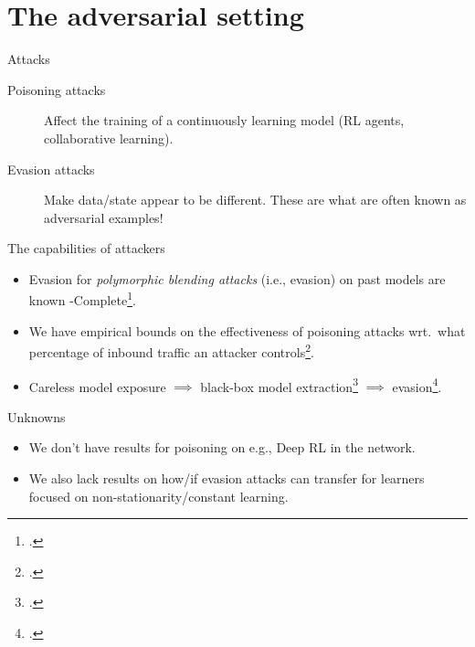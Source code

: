\documentclass[aspectratio=169,xcolor={dvipsnames}
,hide notes
]{beamer}
\begin{document}
\section{The adversarial setting}

\begin{frame}{Attacks}
	\begin{description}
		\item[Poisoning attacks] Affect the training of a continuously learning model (RL agents, collaborative learning).
		
		\item[Evasion attacks] Make data/state appear to be different. These are what are often known as \alert{adversarial examples}!
	\end{description}
\end{frame}

\begin{frame}{The capabilities of attackers}
	\begin{itemize}
		\item Evasion for \emph{polymorphic blending attacks} (i.e., evasion) on past models are known \NP-Complete\footcite{DBLP:conf/ccs/FoglaL06}.
	
		\item We have empirical bounds on the effectiveness of poisoning attacks wrt.\ what percentage of inbound traffic an attacker controls\footcite{DBLP:journals/jmlr/KloftL10}.
		
		\item Careless model exposure $\implies$ black-box model extraction\footcite{DBLP:conf/uss/TramerZJRR16} $\implies$ evasion\footcite{DBLP:conf/sp/Carlini017}.
		
	\end{itemize}
\end{frame}

\begin{frame}{Unknowns}
	\begin{itemize}
		\item We don't have results for poisoning on e.g., Deep RL in the network.
		
		\item We also lack results on how/if evasion attacks can transfer for learners focused on non-stationarity/constant learning.
		
	\end{itemize}
\end{frame}
\end{document}
